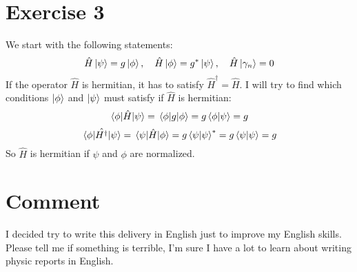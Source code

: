 \documentclass{scrartcl}
\begin{document}
\section{Exercise 3}
We start with the following statements:
$$\hat{H}\ket{\psi}=g\ket{\phi},\quad \hat{H}\ket{\phi}=g^*\ket{\psi},\quad \hat{H}\ket{\gamma_n}=0$$
If the operator $\hat{H}$ is hermitian, it has to satisfy $\hat{H}^\dagger=\hat{H}$. I will try to find which conditions $\ket{\phi}$ and $\ket{\psi}$ must satisfy if $\hat{H}$ is hermitian:
$$\mel*{\phi}{\hat{H}}{\psi}=\mel*{\phi}{g}{\phi}=g\braket{\phi}{\psi}=g$$
$$\mel*{\phi}{\hat{H^\dagger}}{\psi}=\mel*{\psi}{\hat{H}}{\phi}=g\braket{\psi}{\psi}^*=g\braket{\psi}{\psi}=g$$
So $\hat{H}$ is hermitian if $\psi$ and $\phi$ are normalized.
\section{Comment}
I decided try to write this delivery in English just to improve my English skills. Please tell me if something is terrible, I'm sure I have a lot to learn about writing physic reports in English. 
\end{document}
